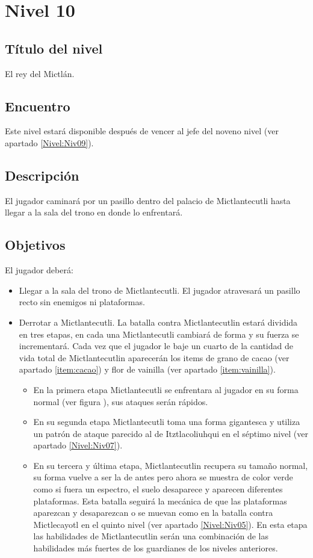 \section{Nivel 10} \label{Nivel:Niv10}
	\subsection{Título del nivel}
	El rey del Mictlán.
	\subsection{Encuentro}
	Este nivel estará disponible después de vencer al jefe del noveno nivel (ver apartado \ref{Nivel:Niv09}). 
	\subsection{Descripción}
	El jugador caminará por un pasillo dentro del palacio de Mictlantecutli hasta llegar a la sala del trono en donde lo enfrentará.
	\subsection{Objetivos}
	El jugador deberá:
	\begin{itemize}
		\item Llegar a la sala del trono de Mictlantecutli. El jugador atravesará un pasillo recto sin enemigos ni plataformas. 
		\item Derrotar a Mictlantecutli. La batalla contra Mictlantecutlin estará dividida en tres etapas, en cada una Mictlantecutli cambiará de forma y su fuerza se incrementará. Cada vez que el jugador le baje un cuarto de la cantidad de vida total de Mictlantecutlin aparecerán los items  de grano de cacao (ver apartado \ref{item:cacao}) y flor de vainilla (ver apartado \ref{item:vainilla}).
		\begin{itemize}
			\item En la primera etapa Mictlantecutli se enfrentara al jugador en su forma normal (ver figura ), sus ataques serán rápidos. 
			\item En su segunda etapa Mictlantecutli toma una forma gigantesca y utiliza un patrón de ataque parecido al de Itztlacoliuhqui en el séptimo nivel (ver apartado \ref {Nivel:Niv07}). 
			\item En su tercera y última etapa, Mictlantecutlin recupera su tamaño normal, su forma vuelve a ser la de antes pero ahora se muestra de color verde como si fuera un espectro, el suelo desaparece y aparecen diferentes plataformas. Esta batalla seguirá la mecánica de que las plataformas aparezcan y desaparezcan o se muevan como en la batalla contra Mictlecayotl en el quinto nivel (ver apartado \ref {Nivel:Niv05}). En esta etapa las habilidades de Mictlantecutlin serán una combinación de las habilidades más fuertes de los guardianes de los niveles anteriores.
		\end{itemize}
	\end{itemize}
